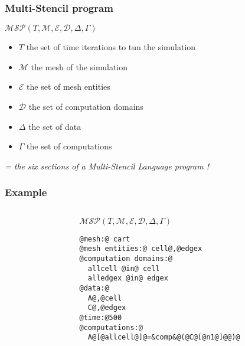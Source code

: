 \documentclass{beamer}
\begin{document}
\begin{frame}
\frametitle{Multi-Stencil program}
\begin{center}
$\mathcal{MSP}(T,\mathcal{M},\mathcal{E},\mathcal{D},\Delta,\Gamma)$
\end{center}
\begin{itemize}
\item $T$ the set of time iterations to tun the simulation
\item $\mathcal{M}$ the mesh of the simulation
\item $\mathcal{E}$ the set of mesh entities
\item $\mathcal{D}$ the set of computation domains
\item $\Delta$ the set of data
\item $\Gamma$ the set of computations
\end{itemize}
\center \textit{= the six sections of a \emph{Multi-Stencil Language} program !}
\end{frame}

\begin{frame}[fragile]
\frametitle{Example}
\begin{columns}
\begin{column}{.52\textwidth}
\hspace{10pt}
\end{column}
\begin{column}{.48\textwidth}
$\mathcal{MSP}(T,\mathcal{M},\mathcal{E},\mathcal{D},\Delta,\Gamma)$\\

\begin{lstlisting}[style=base]
@mesh:@ cart
@mesh entities:@ cell@,@edgex
@computation domains:@
  allcell @in@ cell
  alledgex @in@ edgex
@data:@
  A@,@cell
  C@,@edgex
@time:@500
@computations:@
  A@[@allcell@]@=&comp&@(@C@[@n1@]@@)@
\end{lstlisting}
\end{column}
\end{columns}
\end{frame}
\end{document}
